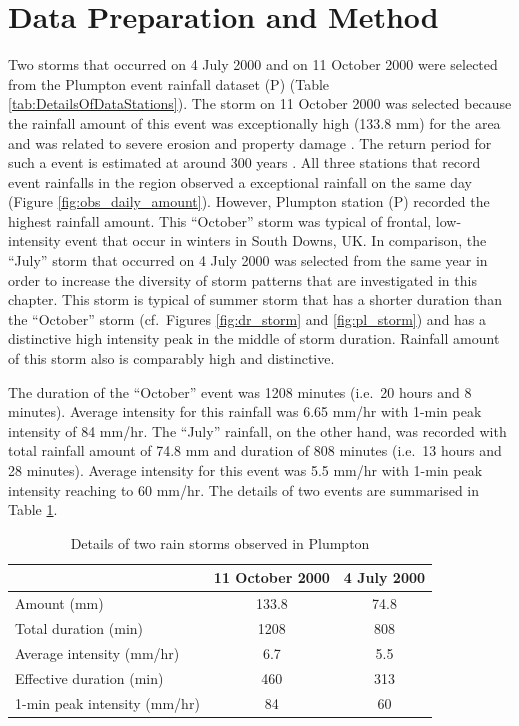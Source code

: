 \section{Data Preparation and Method}
\label{sec:TemporalScalesEffectsMethods}

Two storms that occurred on 4 July 2000 and on 11 October 2000 were selected
from the Plumpton event rainfall dataset (P) (Table
\ref{tab:DetailsOfDataStations}). The storm on 11 October 2000 was selected
because the rainfall amount of this event was exceptionally high (133.8 mm) for
the area and was related to severe erosion and property damage
\citep{boardman2001-346}. The return period for such a event is estimated at
around 300 years \citep{saunders2001-360}. All three stations that record event
rainfalls in the region observed a exceptional rainfall on the same day (Figure
\ref{fig:obs_daily_amount}). However, Plumpton station (P) recorded the highest
rainfall amount. This ``October'' storm was typical of frontal, low-intensity
event that occur in winters in South Downs, UK. In comparison, the ``July''
storm that occurred on 4 July 2000 was selected from the same year in order to
increase the diversity of storm patterns that are investigated in this chapter.
This storm is typical of summer storm that has a shorter duration than the
``October'' storm (cf.\ Figures \ref{fig:dr_storm} and \ref{fig:pl_storm})
and has a distinctive high intensity peak in the middle of storm duration.
Rainfall amount of this storm also is comparably high and distinctive.

The duration of the ``October'' event was 1208 minutes (i.e.\ 20 hours and 8
minutes). Average intensity for this rainfall was 6.65 mm/hr with 1-min peak
intensity of 84 mm/hr. The ``July'' rainfall, on the other hand, was recorded
with total rainfall amount of 74.8 mm and duration of 808 minutes (i.e.\ 13
hours and 28 minutes). Average intensity for this event was 5.5 mm/hr with
1-min peak intensity reaching to 60 mm/hr. The details of two events are
summarised in Table \ref{tab:DetailsoftworainstormsobservedinPlumpton}.

\begin{table}[htbp]
  \centering
  \small
  \caption{Details of two rain storms observed in Plumpton}
  \label{tab:DetailsoftworainstormsobservedinPlumpton}
    \begin{tabular}{lcc}
    \toprule
     & 11 October 2000 & 4 July 2000 \\
    \midrule
    Amount (mm) & 133.8 & 74.8\\
    Total duration (min) & 1208 & 808 \\
    Average intensity (mm/hr) & 6.7 & 5.5 \\
    Effective duration (min) & 460 & 313 \\
    1-min peak intensity (mm/hr) & 84 & 60 \\
    \bottomrule
    \end{tabular}
\end{table}

